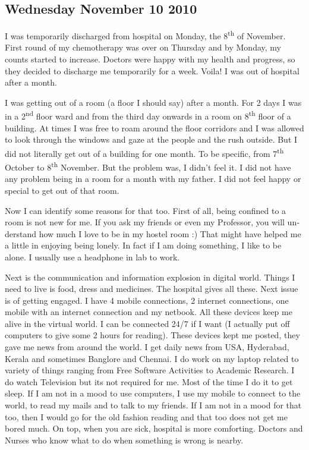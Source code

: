 \vskip 2pt
\begin{english}
\subsection*{Wednesday November 10 2010}

I was temporarily discharged from hospital on Monday, the 8\textsuperscript{th} of November. First round of my chemotherapy 
was over on Thursday and by Monday, my counts started to increase. Doctors were happy with my health and 
progress, so they decided to discharge me temporarily for a week. Voila! I was out of hospital after a month. 

I was getting out of a room (a floor I should say) after a month. For 2 days I was in a 2\textsuperscript{nd} floor ward and from 
the third day onwards in a room on 8\textsuperscript{th} floor of a building. At times I was free to roam around the floor corridors 
and I was allowed to look through the windows and gaze at the people and the rush outside. But I did not literally 
get out of a building for one month. To be specific, from 7\textsuperscript{th} October to 8\textsuperscript{th} November. But the problem was, I didn't 
feel it. I did not have any problem being in a room for a month with my father. I did not feel happy or special to 
get out of that room. 

Now I can identify some reasons for that too. First of all, being confined to a room is not new for me. If you ask 
my friends or even my Professor, you will understand how much I love to be in my hostel room :) That might 
have helped me a little in enjoying being lonely. In fact if I am doing something, I like to be alone. I usually use a 
headphone in lab to work.  

Next is the communication and information explosion in digital world. Things I need to live is food, dress and 
medicines. The hospital gives all these. Next issue is of getting engaged. I have 4 mobile connections, 2 internet 
connections, one mobile with an internet connection and my netbook. All these devices keep me alive in the virtual 
world. I can be connected 24/7 if I want (I actually put off computers to give some 2 hours for reading). These 
devices kept me posted, they gave me news from around the world. I get daily news from USA, Hyderabad, Kerala 
and sometimes Banglore and Chennai. I do work on my laptop related to variety of things ranging from Free Software
Activities to Academic Research. I do watch Television but its not required for me. Most of the time I do it to get 
sleep. If I am not in a mood to use computers, I use my mobile to connect to the world, to read my mails and to talk 
to my friends. If I am not in a mood for that too, then I would go for the old fashion reading and that too does not 
get me bored much. On top, when you are sick, hospital is more comforting. Doctors and Nurses who know what 
to do when something is wrong is nearby.


\end{english}
